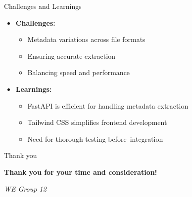 \documentclass{beamer}
\begin{document}
\begin{frame}{Challenges and Learnings}
    \begin{itemize}
        \item \textbf{Challenges:}
        \begin{itemize}
            \item Metadata variations across file formats
            \item Ensuring accurate extraction
            \item Balancing speed and performance
        \end{itemize}
        \item \textbf{Learnings:}
        \begin{itemize}
            \item FastAPI is efficient for handling metadata extraction
            \item Tailwind CSS simplifies frontend development
            \item Need for thorough testing before integration
        \end{itemize}
    \end{itemize}
\end{frame}

\begin{frame}{Thank you}
\begin{center}
        \textbf{Thank you for your time and consideration!}\\        
    \end{center}
    \vspace{1cm}
    \begin{flushright}
        \textit{WE Group 12}
    \end{flushright}
\end{frame}
\end{document}
